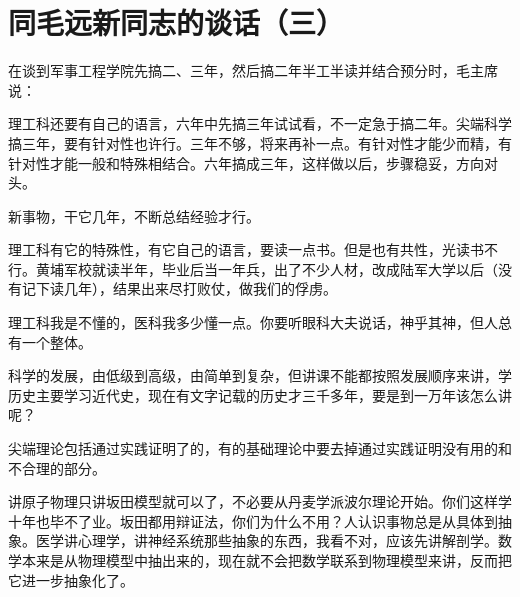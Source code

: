 \section[同毛远新同志的谈话（三）（一九六六年二月十八日）]{同毛远新同志的谈话（三）}


在谈到军事工程学院先搞二、三年，然后搞二年半工半读并结合预分时，毛主席说：

理工科还要有自己的语言，六年中先搞三年试试看，不一定急于搞二年。尖端科学搞三年，要有针对性也许行。三年不够，将来再补一点。有针对性才能少而精，有针对性才能一般和特殊相结合。六年搞成三年，这样做以后，步骤稳妥，方向对头。

新事物，干它几年，不断总结经验才行。

理工科有它的特殊性，有它自己的语言，要读一点书。但是也有共性，光读书不行。黄埔军校就读半年，毕业后当一年兵，出了不少人材，改成陆军大学以后（没有记下读几年），结果出来尽打败仗，做我们的俘虏。

理工科我是不懂的，医科我多少懂一点。你要听眼科大夫说话，神乎其神，但人总有一个整体。

科学的发展，由低级到高级，由简单到复杂，但讲课不能都按照发展顺序来讲，学历史主要学习近代史，现在有文字记载的历史才三千多年，要是到一万年该怎么讲呢？

尖端理论包括通过实践证明了的，有的基础理论中要去掉通过实践证明没有用的和不合理的部分。

讲原子物理只讲坂田模型就可以了，不必要从丹麦学派波尔理论开始。你们这样学十年也毕不了业。坂田都用辩证法，你们为什么不用？人认识事物总是从具体到抽象。医学讲心理学，讲神经系统那些抽象的东西，我看不对，应该先讲解剖学。数学本来是从物理模型中抽出来的，现在就不会把数学联系到物理模型来讲，反而把它进一步抽象化了。


